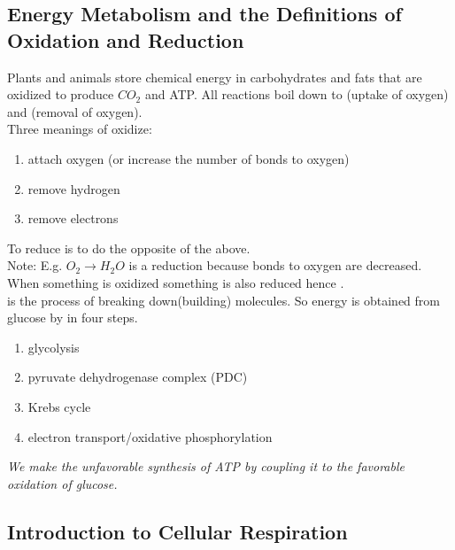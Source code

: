 \documentclass[../Bio_chemistryReview.tex]{subfiles}
\begin{document}
\subsection{Energy Metabolism and the Definitions of Oxidation and Reduction}

Plants and animals store chemical energy in carbohydrates and fats that are
oxidized to produce $ CO_{2} $ and ATP. All reactions boil down to
 (uptake of oxygen) and  (removal of
oxygen).\\
Three meanings of oxidize:
\begin{enumerate}
  \item attach oxygen (or increase the number of bonds to oxygen)
  \item remove hydrogen
  \item remove electrons
\end{enumerate}
To reduce is to do the opposite of the above.\\

Note: E.g. $ O_{2} \rightarrow H_{2}O $ is a reduction because bonds to oxygen
are decreased.\\
When something is oxidized something is also reduced hence .\\
 is the process of breaking down(building)
molecules. So energy is obtained from glucose by  in
four steps.  
\begin{enumerate}
  \item glycolysis
  \item pyruvate dehydrogenase complex (PDC)
  \item Krebs cycle
  \item electron transport/oxidative phosphorylation
\end{enumerate} 

\emph{We make the unfavorable synthesis of ATP by coupling it to the favorable
oxidation of glucose.}

\subsection{Introduction to Cellular Respiration}
\end{document}
